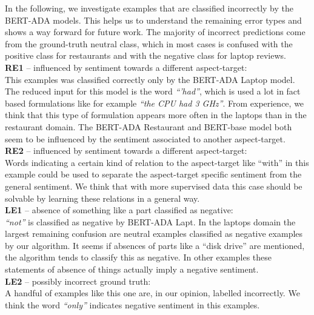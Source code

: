 \documentclass[11pt,a4paper]{article}
\newcommand{\rood}[1]{}
\begin{document}
In the following, we investigate examples that are classified incorrectly by the BERT-ADA models. This helps us to understand 
the remaining error types and shows a way forward for future work.
The majority of incorrect predictions come from the ground-truth neutral class, which in most cases is confused with the positive class for restaurants and with the negative class for laptop reviews. 
\\
\textbf{RE1} -- influenced by sentiment towards a different aspect-target: \\
This examples was classified correctly only by the BERT-ADA Laptop model. The reduced input for this model is the word \textit{``'had''}, which is used a lot in fact based formulations like for example \textit{``the CPU had 3 GHz''}. From experience, we think that this type of formulation appears more often in the laptops than in the restaurant domain. The BERT-ADA Restaurant and BERT-base model both seem to be influenced by the sentiment associated to another aspect-target.
\\
\textbf{RE2} -- influenced by sentiment towards a different aspect-target: \\
Words indicating a certain kind of relation to the aspect-target like ``with''  in this example could be used to separate the aspect-target specific sentiment from the general sentiment. We think that with more supervised data this case should be solvable by learning these relations in a general way.
\\
\textbf{LE1} -- absence of something like a part classified as negative: \\
\textit{``not''} is classified as negative by BERT-ADA Lapt. In the laptops domain the largest remaining confusion are neutral examples classified as negative examples by our algorithm. It seems if absences of parts like a ``disk drive'' are mentioned, the algorithm tends to classify this as negative. In other examples these statements of absence of things actually imply a negative sentiment.
\\
\textbf{LE2} -- possibly incorrect ground truth: \\
A handful of examples like this one are, in our opinion, labelled incorrectly. We think the word \textit{``only''} indicates negative sentiment in this examples.
  
\rood{Types: context specific sentiment inverters (gratuity added to bill vs. gave gratuity to waiter); general sentiment negators (should); dissocation from general sentiment; context-specific interpretation of a quantitative formulation (has no dvd drive, 5 min away location, 5-dishes menu, 4 usb ports, 5 Ghz processor) of an aspect-target}
\end{document}
